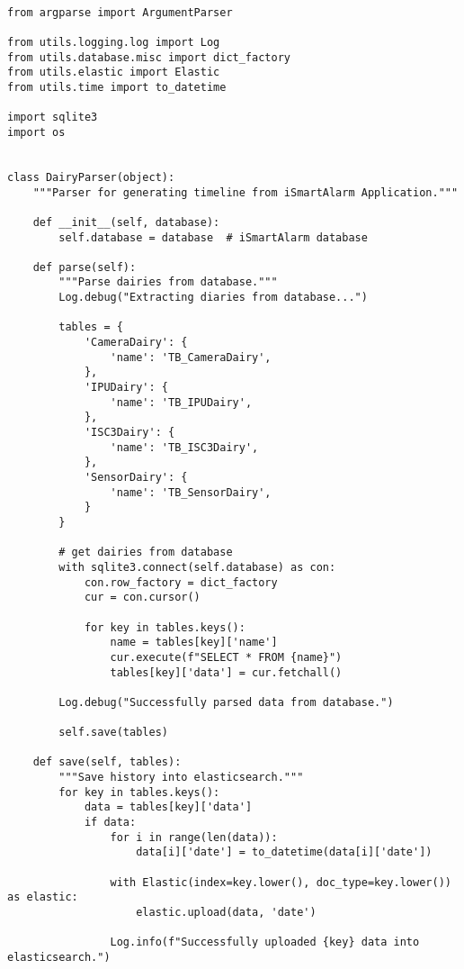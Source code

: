 \documentclass{easychair}
\begin{document}
\lstset{language=Python}
\lstset{frame=lines}
\lstset{basicstyle=\footnotesize}
\begin{lstlisting}

from argparse import ArgumentParser

from utils.logging.log import Log
from utils.database.misc import dict_factory
from utils.elastic import Elastic
from utils.time import to_datetime

import sqlite3
import os


class DairyParser(object):
    """Parser for generating timeline from iSmartAlarm Application."""

    def __init__(self, database):
        self.database = database  # iSmartAlarm database

    def parse(self):
        """Parse dairies from database."""
        Log.debug("Extracting diaries from database...")

        tables = {
            'CameraDairy': {
                'name': 'TB_CameraDairy',
            },
            'IPUDairy': {
                'name': 'TB_IPUDairy',
            },
            'ISC3Dairy': {
                'name': 'TB_ISC3Dairy',
            },
            'SensorDairy': {
                'name': 'TB_SensorDairy',
            }
        }

        # get dairies from database
        with sqlite3.connect(self.database) as con:
            con.row_factory = dict_factory
            cur = con.cursor()

            for key in tables.keys():
                name = tables[key]['name']
                cur.execute(f"SELECT * FROM {name}")
                tables[key]['data'] = cur.fetchall()

        Log.debug("Successfully parsed data from database.")

        self.save(tables)

    def save(self, tables):
        """Save history into elasticsearch."""
        for key in tables.keys():
            data = tables[key]['data']
            if data:
                for i in range(len(data)):
                    data[i]['date'] = to_datetime(data[i]['date'])

                with Elastic(index=key.lower(), doc_type=key.lower()) as elastic:
                    elastic.upload(data, 'date')
                
                Log.info(f"Successfully uploaded {key} data into elasticsearch.")


\end{lstlisting}
\end{document}
